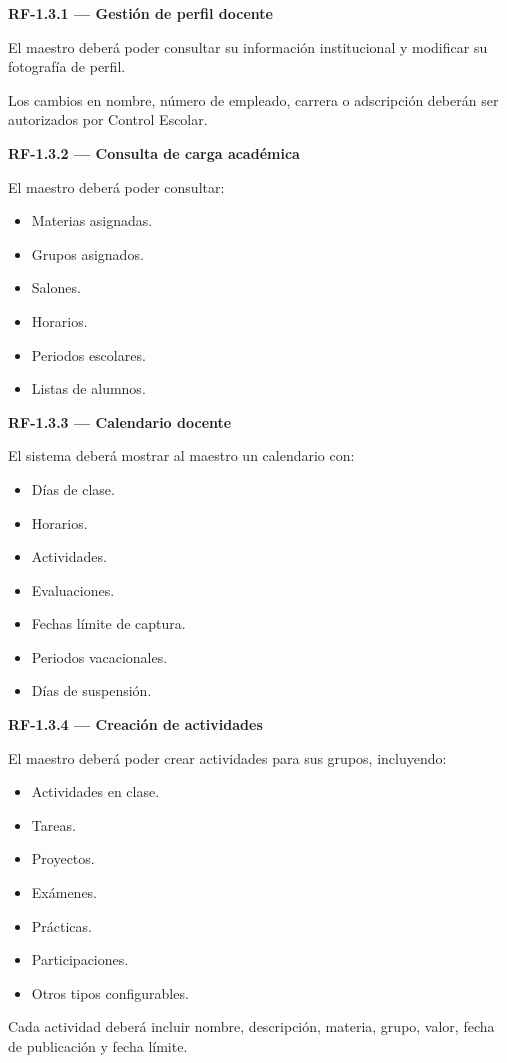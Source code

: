 \documentclass[12pt,a4paper]{article}
\newcommand{\RF}[1]{\textbf{\color{primary}RF-#1}}
\newenvironment{requisito}[1]
{
\begin{center}
\begin{minipage}{0.96\textwidth}
\colorbox{requirement}{
\begin{minipage}{0.94\textwidth}
\textbf{#1}
\end{minipage}
}
\vspace{2mm}
}
{
\end{minipage}
\end{center}
}
\begin{document}
\begin{requisito}{\RF{1.3.1} --- Gestión de perfil docente}
El maestro deberá poder consultar su información institucional y modificar su
fotografía de perfil.

Los cambios en nombre, número de empleado, carrera o adscripción deberán ser
autorizados por Control Escolar.
\end{requisito}

\begin{requisito}{\RF{1.3.2} --- Consulta de carga académica}
El maestro deberá poder consultar:

\begin{itemize}[leftmargin=*]
\item Materias asignadas.
\item Grupos asignados.
\item Salones.
\item Horarios.
\item Periodos escolares.
\item Listas de alumnos.
\end{itemize}
\end{requisito}

\begin{requisito}{\RF{1.3.3} --- Calendario docente}
El sistema deberá mostrar al maestro un calendario con:

\begin{itemize}[leftmargin=*]
\item Días de clase.
\item Horarios.
\item Actividades.
\item Evaluaciones.
\item Fechas límite de captura.
\item Periodos vacacionales.
\item Días de suspensión.
\end{itemize}
\end{requisito}

\begin{requisito}{\RF{1.3.4} --- Creación de actividades}
El maestro deberá poder crear actividades para sus grupos, incluyendo:

\begin{itemize}[leftmargin=*]
\item Actividades en clase.
\item Tareas.
\item Proyectos.
\item Exámenes.
\item Prácticas.
\item Participaciones.
\item Otros tipos configurables.
\end{itemize}

Cada actividad deberá incluir nombre, descripción, materia, grupo, valor,
fecha de publicación y fecha límite.
\end{requisito}
\end{document}
